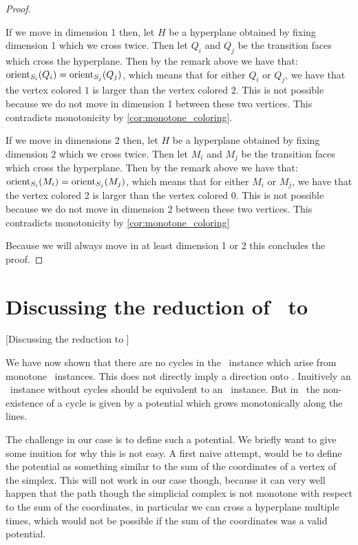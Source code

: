\begin{proof}
	\begin{case}{1}
		If we move in dimension 1 then, let $H$ be a hyperplane obtained by fixing dimension 1 which we cross twice. Then let $Q_i$ and $Q_j$ be the transition faces which cross the hyperplane. Then by the remark above we have that: $\operatorname{orient}_{S_i}(Q_i) = \operatorname{orient}_{S_j}(Q_j)$, which means that for either $Q_i$ or $Q_j$, we have that the vertex colored $1$ is larger than the vertex colored $2$. This is not possible because we do not move in dimension 1 between these two vertices. This contradicts monotonicity by \cref{cor:monotone_coloring}.
	\end{case}
	\begin{case}{2}
		If we move in dimensions 2 then, let $H$ be a hyperplane obtained by fixing dimension 2 which we cross twice. Then let $M_i$ and $M_j$ be the transition faces which cross the hyperplane. Then by the remark above we have that: $\operatorname{orient}_{S_i}(M_i) = \operatorname{orient}_{S_j}(M_j)$, which means that for either $M_i$ or $M_j$, we have that the vertex colored $2$ is larger than the vertex colored $0$. This is not possible because we do not move in dimension 2 between these two vertices. This contradicts monotonicity by \cref{cor:monotone_coloring}
	\end{case}
	Because we will always move in at least dimension 1 or 2 this concludes the proof.
\end{proof}

\section{Discussing the reduction of \Tarskistar\ to \EndOfPotentialLine}[Discussing the reduction to \EOPL]

We have now shown that there are no cycles in the \EndOfLine\ instance which arise from monotone \Tarskistar\ instances. This does not directly imply a direction onto \EndOfPotentialLine. Inuitively an \EndOfLine\ instance without cycles should be equivalent to an \EndOfPotentialLine\ instance. But in \EndOfPotentialLine\ the non-existence of a cycle is given by a potential which grows monotonically along the lines.

The challenge in our case is to define such a potential. We briefly want to give some inuition for why this is not easy. A first naive attempt, would be to define the potential as something similar to the sum of the coordinates of a vertex of the simplex. This will not work in our case though, because it can very well happen that the path though the simplicial complex is not monotone with respect to the sum of the coordinates, in particular we can cross a hyperplane multiple times, which would not be possible if the sum of the coordinates was a valid potential.

